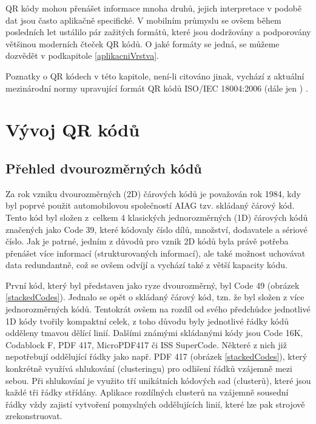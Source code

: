 QR kódy mohou přenášet informace mnoha druhů, jejich interpretace v podobě dat 
jsou často aplikačně specifické. V mobilním průmyslu se ovšem během posledních let 
ustálilo pár zažitých formátů, které jsou dodržovány a podporovány většinou 
moderních čteček QR kódů. O jaké formáty se jedná, se můžeme dozvědět v 
podkapitole \ref{aplikacniVrstva}.

Poznatky o QR kódech v této kapitole, není-li citováno jinak, vychází z aktuální 
mezinárodní normy upravující formát QR kódů ISO/IEC 18004:2006 
(dále jen ) \cite{ISO180042006}.

\section{Vývoj QR kódů}
\label{vyvojQRKodu}

\subsection{Přehled dvourozměrných kódů}
\label{prehled2DKodu}

Za rok vzniku dvourozměrných (2D) čárových kódů je považován rok 1984,
kdy byl poprvé použit automobilovou společností AIAG  tzv. skládaný čárový kód. 
Tento kód byl složen z~celkem 4 klasických jednorozměrných (1D) čárových kódů 
značených jako Code 39, které kódovaly číslo dílů, množství, dodavatele a 
sériové číslo. Jak je patrné, jedním z důvodů pro vznik 2D kódů byla právě 
potřeba přenášet více informací (strukturovaných informací), ale také možnost 
uchovávat data redundantně, což se ovšem odvíjí a vychází také z větší kapacity
kódu.
\cite{adams12D}

První kód, který byl představen jako ryze dvourozměrný, byl Code 49 (obrázek
\ref{stackedCodes}).
Jednalo se opět o skládaný čárový kód, tzn. že byl složen z více jednorozměrných 
kódů. Tentokrát ovšem na rozdíl od svého předchůdce jednotlivé 1D kódy tvořily 
kompaktní celek, z toho důvodu byly jednotlivé řádky kódů odděleny tmavou 
dělící linií. Dalšími známými skládanými kódy jsou Code 16K, Codablock F, 
PDF 417, MicroPDF417 či ISS SuperCode. Některé z nich již nepotřebují oddělující 
řádky jako např. PDF 417 (obrázek \ref{stackedCodes}), který konkrétně využívá
shlukování (clusteringu) pro odlišení řádků vzájemně mezi sebou. Při shlukování je využito tří unikátních 
kódových sad (clusterů), které jsou každé tři řádky střídány. Aplikace rozdílných 
clusterů na vzájemně sousední řádky vždy zajistí vytvoření pomyslných 
oddělujících linií, které lze pak strojově zrekonstruovat.
\cite{AIMStacked,neodynamic}
             
